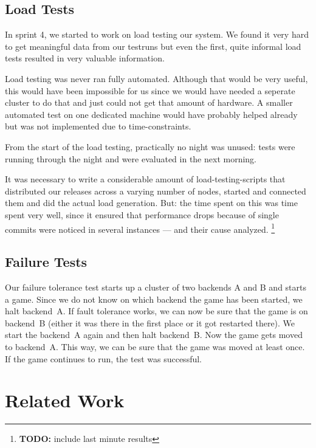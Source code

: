 \documentclass[11pt,a4paper]{report}
\newcommand{\hi}[1]{{\color{red}\em #1\/}\\}
\newcommand{\todo}[1]{\footnote{{\color{red} {\bf TODO:} #1}}}
\begin{document}
\section{Load Tests}
In sprint 4, we started to work on load testing our system. We found it very
hard to get meaningful data from our testruns but even the first, quite informal
load tests resulted in very valuable information.

Load testing was never ran fully automated. Although that would be very useful,
this would have been impossible for us since we would have needed a seperate
cluster to do that and just could not get that amount of hardware.
A smaller automated test on one dedicated machine would have probably helped
already but was not implemented due to time-constraints.

From the start of the load testing, practically no night was unused: tests were
running through the night and were evaluated in the next morning.

It was necessary to write a considerable amount of load-testing-scripts that
distributed our releases across a varying number of nodes, started and connected
them and did the actual load generation. But: the time spent on this was time
spent very well, since it ensured that performance drops because of single
commits were noticed in several instances --- and their cause analyzed.
\todo{include last minute results}
\section{Failure Tests}
Our failure tolerance test starts up a cluster of two backends A and B and starts
a game.
Since we do not know on which backend the game has been started, we halt
backend~A. If fault tolerance works, we can now be sure that the game is on backend~B
(either it was there in the first place or it got restarted there).
We start the backend~A again and then halt backend~B. Now the game gets moved to
backend~A. This way, we can be sure that the game was moved at least once.
If the game continues to run, the test was successful.

\chapter{Related Work}

\end{document}
